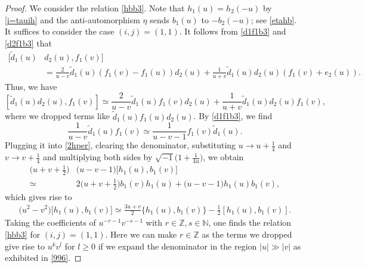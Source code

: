 \documentclass[11pt,reqno]{amsart}
\numberwithin{equation}{section}
\theoremstyle{definition}
\theoremstyle{remark}
\newcommand{\beq}{\begin{equation}}
\newcommand{\eeq}{\end{equation}}
\newcommand{\bZ}{\mathbb{Z}}
\newcommand{\bN}{\mathbb{N}}
\newcommand{\tl}{\tilde}
\newcommand{\gge}{\geqslant}
\def \Z{\mathbb{Z}}
\begin{document}
\begin{proof}
We consider the relation \eqref{hbb3}. Note that $h_1(u)=h_2(-u)$ by \eqref{i=tauih} and the anti-automorphism $\eta$ sends $b_1(u)$ to $-b_2(-u)$; see \eqref{etahb}. It suffices to consider the case $(i,j)=(1,1)$. It follows from \eqref{d1f1b3} and \eqref{d2f1b3} that
\beq\label{1helper}
\begin{split}
[\tl d_1(u)&d_2(u),f_1(v)]\\&=\frac{2}{u-v}\tl d_1(u)(f_1(v)-f_1(u))d_2(u)+\frac{1}{u+v}\tl d_1(u)d_2(u)(f_1(v)+e_2(u)).    
\end{split}
\eeq
Thus, we have
\beq\label{2hper}
[\tl d_1(u)d_2(u),f_1(v)]\simeq\frac{2}{u-v}\tl d_1(u)f_1(v)d_2(u)+\frac{1}{u+v}\tl d_1(u)d_2(u)f_1(v),
\eeq
where we dropped terms like $\tl d_1(u)f_1(u)d_2(u)$. By \eqref{d1f1b3}, we find
\[
\frac{1}{u-v}\tl d_1(u)f_1(v)\simeq \frac{1}{u-v-1}f_1(v)\tl d_1(u).
\]
Plugging it into \eqref{2hper}, clearing the denominator, substituting $u\to u+\frac14$ and $v\to v+\frac14$ and multiplying both sides by $\sqrt{-1}\big(1+\frac{1}{4u}\big)$, we obtain
\begin{align*}
\big(u+v+\tfrac{1}{2}\big)&\big(u-v-1\big)\big[h_1(u),b_1(v)\big]\\
\simeq\,&2 \big(u+v+\tfrac{1}{2}\big)b_1(v)h_1(u)+ \big(u-v-1\big)h_1(u)b_1(v),
\end{align*}
which gives rise to
\begin{align*}
\big(u^2-v^2\big)\big[h_1(u),b_1(v)\big]
\simeq \frac{3u+v}{2} \big\{h_1(u),b_1(v)\big\}-\frac{1}{2}[h_1(u),b_1(v)].                               
\end{align*}
Taking the coefficients of $u^{-r-1}v^{-s-1}$  with $r\in\bZ,s\in\bN$, one finds the relation \eqref{hbb3} for $(i,j)=(1,1)$. Here we can make $r\in\Z$ as the terms we dropped give rise to $u^{k}v^{l}$ for $l\gge 0$ if we expand the denominator in the region $|u|\gg |v|$ as exhibited in \eqref{996}.
\end{proof}


\end{document}
